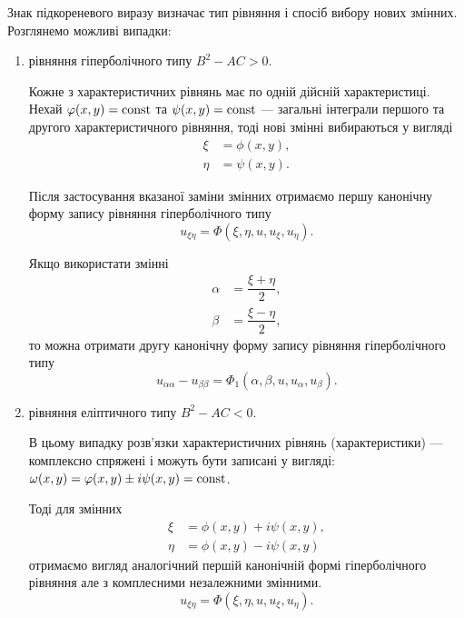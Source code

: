 Знак підкореневого виразу визначає тип рівняння і спосіб вибору нових змінних. Розглянемо можливі випадки:
\begin{enumerate}
	\item рівняння гіперболічного типу $B^2 - AC > 0$. \medskip

	Кожне з  характеристичних рівнянь має по одній дійсній характеристиці. Нехай $\varphi(x,y)=\operatorname{const}$ та $\psi(x,y)=\operatorname{const}$ --- загальні інтеграли першого та другого характеристичного рівняння, тоді нові змінні вибираються у вигляді
	\begin{align}
		\xi &= \phi(x, y), \\
		\eta &= \psi(x, y).
	\end{align}

	Після застосування вказаної заміни змінних отримаємо першу канонічну форму запису рівняння гіперболічного типу 
	\begin{equation}
		u_{\xi\eta} = \Phi(\xi, \eta, u, u_\xi, u_\eta).
	\end{equation}

	\begin{remark}
		Якщо використати змінні
		\begin{align}
			\alpha &= \dfrac{\xi+\eta}{2}, \\
			\beta &= \dfrac{\xi-\eta}{2},
		\end{align}
		то можна отримати другу канонічну форму запису рівняння гіперболічного типу
		\begin{equation}
			u_{\alpha\alpha} - u_{\beta\beta} = \Phi_1(\alpha, \beta, u, u_\alpha, u_\beta).
		\end{equation}
	\end{remark}

	\item рівняння еліптичного типу $B^2 - AC < 0$. \medskip

	В цьому випадку розв'язки характеристичних рівнянь (характеристики) --- комплексно спряжені і можуть бути записані у вигляді: $\omega(x,y)=\varphi(x,y)\pm i\psi(x,y)=\operatorname{const}$. \medskip

	Тоді для змінних
	\begin{align}
		\xi &= \phi(x,y) + i \psi(x, y), \\
		\eta &= \phi(x, y) - i \psi(x, y)
	\end{align}
	отримаємо вигляд аналогічний першій канонічній формі гіперболічного рівняння але з комплесними незалежними змінними.
	\begin{equation}
		u_{\xi\eta}=\Phi(\xi,\eta,u,u_\xi,u_\eta).
	\end{equation}


\end{enumerate}
